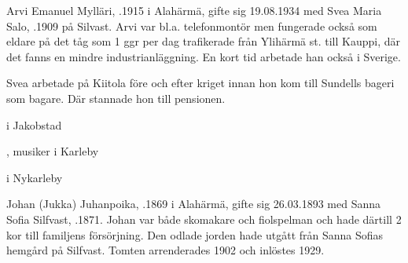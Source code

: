 Arvi Emanuel Mylläri, .1915 i Alahärmä, gifte sig 19.08.1934 med Svea Maria Salo, .1909 på Silvast. Arvi var bl.a. telefonmontör men fungerade också som eldare på det tåg som 1 ggr per dag trafikerade från Ylihärmä st. till Kauppi, där det fanns en mindre industrianläggning. En kort tid arbetade han också i Sverige.

Svea arbetade på Kiitola före och efter kriget innan hon kom till Sundells bageri som bagare. Där stannade hon till pensionen.
\begin{jhchildren}
  \item {} i Jakobstad
  \item {}, musiker i Karleby
  \item {} i Nykarleby
\end{jhchildren}


Johan (Jukka) Juhanpoika, .1869 i Alahärmä, gifte sig 26.03.1893 med Sanna Sofia Silfvast, .1871. Johan var både skomakare och fiolspelman och hade därtill 2 kor till familjens försörjning. Den odlade jorden hade utgått från Sanna Sofias hemgård på Silfvast. Tomten arrenderades 1902 och inlöstes 1929.
\begin{jhchildren}
  \item {}
  \item {}
  \item {}
  \item {}
  \item {}
  \item {}
\end{jhchildren}




